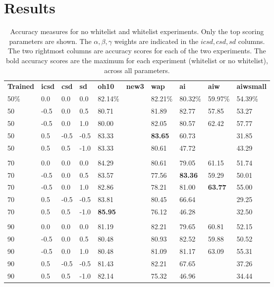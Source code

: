\documentclass{article}
\begin{document}
\section{Results}

\begin{table}[ht]
  \begin{center}
  \begin{tabular}{llllllllll}
    \textbf{Trained} & \textbf{icsd} & \textbf{csd} & \textbf{sd} &
    \textbf{oh10} & \textbf{new3} & \textbf{wap} & \textbf{ai} & \textbf{aiw} & \textbf{aiwsmall}\\

    50\% & 0.0 & 0.0 & 0.0 & 82.14\% & & 82.21\% & 80.32\% & 59.97\% & 54.39\% \\
    50 & -0.5 & 0.0 & 0.5 & 80.71 & & 81.89 & 82.77 & 57.85 & 53.27 \\
    50 & -0.5 & 0.0 & 1.0 & 80.00 & & 82.05 & 80.57 & 62.42 & 57.77 \\
    50 & 0.5 & -0.5 & -0.5 & 83.33 & & \textbf{83.65} & 60.73 & & 31.85 \\ 
    50 & 0.5 & 0.5 & -1.0 & 83.33 & & 80.61 & 47.72 & & 43.29 \\
    &  &  &  &  & & & & & \\
    70 & 0.0 & 0.0 & 0.0 & 84.29 & & 80.61 & 79.05 & 61.15 & 51.74 \\
    70 & -0.5 & 0.0 & 0.5 & 83.57 & & 77.56 & {\textbf{83.36}} & 59.29 & 50.01 \\
    70 & -0.5 & 0.0 & 1.0 & 82.86 & & 78.21 & 81.00 & {\textbf{63.77}} & 55.00 \\
    70 & 0.5 & -0.5 & -0.5 & 83.81 & & 80.45 & 66.64 & & 29.25 \\
    70 & 0.5 & 0.5 & -1.0 & \textbf{85.95} & & 76.12 & 46.28 & & 32.50 \\
    &  &  &  &  & & & & & \\
    90 & 0.0 & 0.0 & 0.0 & 81.19 & & 82.21 & 79.65 & 60.81 & 52.15 \\
    90 & -0.5 & 0.0 & 0.5 & 80.48 & & 80.93 & 82.52 & 59.88 & 50.52 \\
    90 & -0.5 & 0.0 & 1.0 & 80.48 & & 81.09 & 81.17 & 63.09 & 55.31 \\
    90 & 0.5 & -0.5 & -0.5 & 81.43 & & 82.21 & 67.65 & & 37.26 \\ 
    90 & 0.5 & 0.5 & -1.0 & 82.14 & & 75.32 & 46.96 & & 34.44
  \end{tabular}
  \end{center}

  \caption{Accuracy measures for no whitelist and whitelist experiments. Only
the top scoring parameters are shown. The $\alpha,\beta,\gamma$ weights are
indicated in the $icsd,csd,sd$ columns. The two rightmost columns are accuracy
scores for each of the two experiments. The bold accuracy scores are the
maximum for each experiment (whitelist or no whitelist), across all
parameters.}

  \label{table:accuracy}
\end{table}
\end{document}
